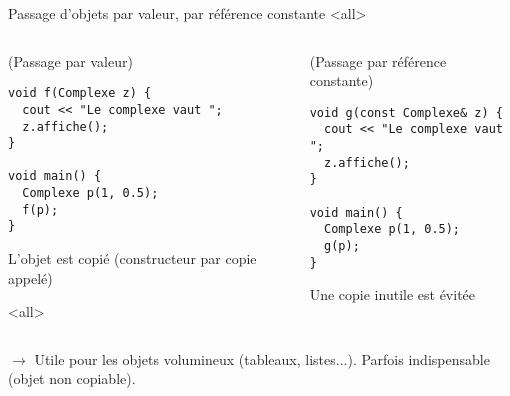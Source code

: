 \documentclass[c]{beamer}
\begin{document}
\begin{frame}[fragile]{Passage d'objets par valeur, par référence constante}
 \onslide<all>
\begin{columns}
\begin{column}{0.5\columnwidth}
\begin{cbox}[][lwuc][\footnotesize](Passage par valeur)
\begin{verbatim}
void f(Complexe z) {
  cout << "Le complexe vaut ";
  z.affiche();
}

void main() {
  Complexe p(1, 0.5);
  f(p);
}
\end{verbatim}

\begin{cbox}[][][\centering]
L'objet est copié (constructeur par copie appelé)
\end{cbox}

\onslide<all>
\end{cbox}
\end{column}
\begin{column}{0.5\columnwidth}
\begin{cbox}[][lwuc][\footnotesize](Passage par référence constante)
\begin{verbatim}
void g(const Complexe& z) {
  cout << "Le complexe vaut ";
  z.affiche();
}

void main() {
  Complexe p(1, 0.5);
  g(p);
}
\end{verbatim}

\begin{cbox}[][][\centering]
Une copie inutile est évitée
\end{cbox}
\vspace{0.45em}
\end{cbox}
\end{column}
\end{columns}

\vspace{1em}
\pause
$\rightarrow$ Utile pour les objets volumineux (tableaux, listes...). Parfois indispensable (objet non copiable).

\end{frame}

\end{document}
